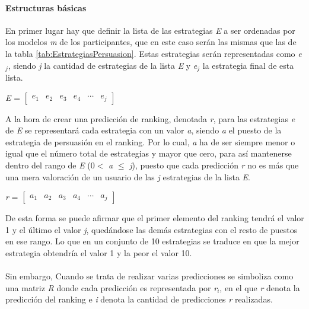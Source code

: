 \paragraph{Estructuras básicas} En primer lugar hay que definir la lista de las estrategias \textit{E} a ser ordenadas por los modelos \textit{m} de los participantes, que en este caso serán las mismas que las de la tabla \ref{tab:EstrategiasPersuasion}. Estas estrategias serán representadas como \textit{e$_{j}$}, siendo \textit{j} la cantidad de estrategias de la lista \textit{E} y \textit{e$_{j}$} la estrategia final de esta lista. 
\begin{center}
    \textit{E} = $\begin{bmatrix} \textit{e$_{1}$} & \textit{e$_{2}$} & \textit{e$_{3}$} & \textit{e$_{4}$} & \cdots & \textit{e$_{j}$} \end{bmatrix}$ 
\end{center}
A la hora de crear una predicción de ranking, denotada \textit{r}, para las estrategias \textit{e} de \textit{E} se representará cada estrategia con un valor \textit{a}, siendo \textit{a} el puesto de la estrategia de persuasión en el ranking. Por lo cual, \textit{a} ha de ser siempre menor o igual que el número total de estrategias y mayor que cero, para así mantenerse dentro del rango de \textit{E} (0$<$
\textit{a }$\leq$\textit{ j}), puesto que cada predicción \textit{r} no es más que una mera valoración de un usuario de las \textit{j} estrategias de la lista \textit{E}.
\begin{center}
    \textit{r} = $\begin{bmatrix} \textit{a$_{1}$} & \textit{a$_{2}$} & \textit{a$_{3}$} & \textit{a$_{4}$} & \cdots & \textit{a$_{j}$} \end{bmatrix}$ 
\end{center}
De esta forma se puede afirmar que el primer elemento del ranking tendrá el valor 1 y el último el valor \textit{j}, quedándose las demás estrategias con el resto de puestos en ese rango. Lo que en un conjunto de 10 estrategias se traduce en que la mejor estrategia obtendría el valor 1 y la peor el valor 10.
\\ \\
Sin embargo, Cuando se trata de realizar varias predicciones se simboliza como una matriz \textit{R} donde cada predicción es representada  por \textit{r$_{i}$}, en el que \textit{r} denota la predicción del ranking  e \textit{i} denota la cantidad de predicciones \textit{r} realizadas.
